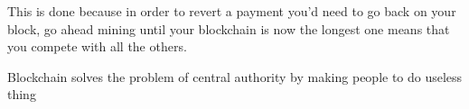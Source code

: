                             This is done because in order to revert a payment you'd need to go back on your block, go ahead mining until your blockchain is now the longest one
                            means that you compete with all the others.

                            Blockchain solves the problem of central authority by making people to do useless thing 





\fi